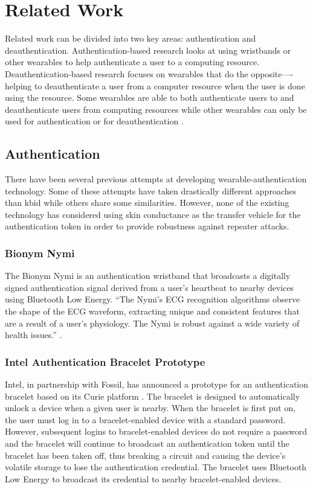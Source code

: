 \section{Related Work}
Related work can be divided into two key areas: authentication and deauthentication.  Authentication-based research looks at using wristbands or other wearables to help authenticate a user to a computing resource.  Deauthentication-based research focuses on wearables that do the opposite—-helping to deauthenticate a user from a computer resource when the user is done using the resource.  Some wearables are able to both authenticate users to and deauthenticate users from computing resources \cite{} while other wearables can only be used for authentication or for deauthentication \cite{}.

\subsection{Authentication}
There have been several previous attempts at developing wearable-authentication technology.  Some of these attempts have taken drastically different approaches than kbid while others share some similarities.  However, none of the existing technology has considered using skin conductance as the transfer vehicle for the authentication token in order to provide robustness against repeater attacks.

\subsubsection{Bionym Nymi}
The Bionym Nymi \cite{} is an authentication wristband that broadcasts a digitally signed authentication signal derived from a user’s heartbeat to nearby devices using Bluetooth Low Energy.  “The Nymi’s ECG recognition algorithms observe the shape of the ECG waveform, extracting unique and consistent features that are a result of a user’s physiology. The Nymi is robust against a wide variety of health issues.” \cite{}.

\subsubsection{Intel Authentication Bracelet Prototype}
Intel, in partnership with Fossil, has announced a prototype for an authentication bracelet based on its Curie platform \cite{}.  The bracelet is designed to automatically unlock a device when a given user is nearby.  When the bracelet is first put on, the user must log in to a bracelet-enabled device with a standard password.  However, subsequent logins to bracelet-enabled devices do not require a password and the bracelet will continue to broadcast an authentication token until the bracelet has been taken off, thus breaking a circuit and causing the device’s volatile storage to lose the authentication credential.  The bracelet uses Bluetooth Low Energy to broadcast its credential to nearby bracelet-enabled devices.

